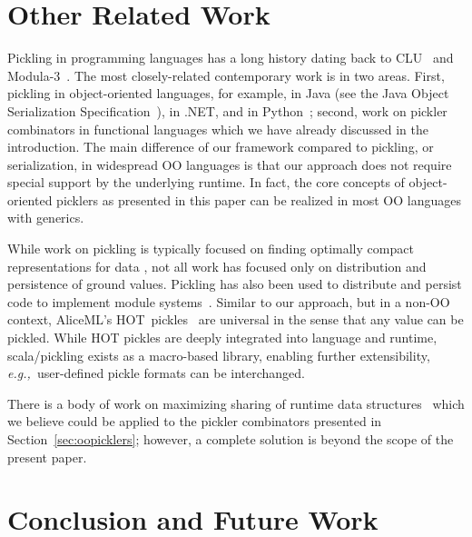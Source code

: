 \documentclass[10pt]{sigplanconf}
\theoremstyle{definition}
\theoremstyle{definition}
\newcommand{\eg}{{\em e.g.,~}}
\begin{document}
\section{Other Related Work}
\label{sec:related-work}

Pickling in programming languages has a long history dating back to
CLU~\cite{HerlihyL82} and Modula-3~\cite{CardelliDJKN89}. The most
closely-related contemporary work is in two areas. First, pickling in
object-oriented languages, for example, in Java (see the Java Object
Serialization Specification~\cite{JavaSerialization}), in .NET, and in
Python~\cite{Rossum07}; second, work on pickler combinators in
functional languages which we have already discussed in the
introduction. The main difference of our framework compared to
pickling, or serialization, in widespread OO languages is that our
approach does not require special support by the underlying
runtime. In fact, the core concepts of object-oriented picklers as
presented in this paper can be realized in most OO languages with
generics.

While work on pickling is typically focused on finding optimally compact
representations for data \cite{EveryBitCounts}, not all work has focused only
on distribution and persistence of ground values. Pickling has also been
used to distribute and persist code to implement module systems~\cite{Roy99,Rossberg2007}.
Similar to our approach, but in a non-OO context, AliceML's HOT~pickles~\cite{HOTPickles}
are universal in the sense that any value
can be pickled. While HOT pickles are deeply integrated into language and
runtime, scala/pickling exists as a macro-based library, enabling further
extensibility, \eg user-defined pickle formats can be interchanged.

There is a body of work on maximizing sharing of runtime data
structures~\cite{appel93hashconsing,Elsman2005,TackKS06} which we believe
could be applied to the pickler combinators presented in
Section~\ref{sec:oopicklers}; however, a complete solution is beyond the scope
of the present paper.



\section{Conclusion and Future Work}
\end{document}
